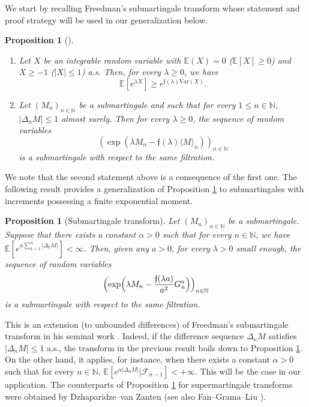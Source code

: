 \documentclass[JEP,XML,SOM,Unicode,published]{cedram}
\theoremstyle{plain}
\newtheorem{proposition}[theorem]{Proposition}
\theoremstyle{definition}
\newcommand\N{\mathbb{N}}
\begin{document}
We start by recalling Freedman's submartingale transform whose statement and proof strategy will be used in our generalization below.

\skpt
\begin{proposition}[{\cite[Cor.\,1.4(b), (3.7) \& (3.9)]{Freedman}}]\label{prop.freedman.submartingale}
\begin{enumerate}
\item
Let $X$ be an integrable random variable with $\mathbb{E}(X)=0$ (\resp $\mathbb{E}[X] \geq 0$) and $X\geq -1$ (\resp $|X| \leq 1$) a.s. Then, for every $\lambda \geq 0$, we have
\[
\mathbb{E}[e^{\lambda X}] \geq e^{\mathfrak{f}(\lambda) \mathrm{Var}(X)}.
\]
\item
Let $(M_n)_{n\in \N}$ be a submartingale and such that for every $1 \leq n \in \N$, $|\Delta_n M|\leq 1$ almost surely. Then for every $\lambda \geq 0$, the sequence of random variables
\[
\left(\exp\left(\lambda M_n - \mathfrak{f}(\lambda) \langle M\rangle_n\right)\right)_{n \in \N}
\]
is a submartingale with respect to the same filtration.
\end{enumerate}
\end{proposition}

We note that the second statement above is a consequence of the first one.
The following result provides a generalization of Proposition \ref{prop.freedman.submartingale} to submartingales with increments possessing a finite exponential moment.

\begin{proposition}[Submartingale transform]\label{prop.submart.trans}
Let $(M_n)_{n\in \N}$ be a submartingale. Suppose that there exists a constant $\alpha>0$ such that for every $n \in \N$, we have $\mathbb{E}[e^{\alpha \sum_{k=1}^n |\Delta_k M|}]<\infty$. Then, given any $a>0$, for every $\lambda >0$ small enough, the sequence of random variables
\[
\Bigl(\exp\Bigl(\lambda M_n - \frac{\mathfrak{f}(\lambda a)}{a^2}G_n^a\Bigr)\Bigr)_{n \in \N}
\]
is a submartingale with respect to the same filtration.
\end{proposition}

This is an extension (to unbounded differences) of Freedman's submartingale transform in his seminal work \cite{Freedman}. Indeed, if the difference sequence $\Delta_n M$ satisfies $|\Delta_n M| \leq 1$ a.s., the transform in the previous result boils down to Proposition \ref{prop.freedman.submartingale}. On the other hand, it applies, for instance, when there exists a constant $\alpha>0$ such that for every $n\in \N$, $\mathbb{E}[e^{\alpha |\Delta_n M|} | \mathcal{F}_{n-1}]<+\infty$.
This will be the case in our application.
The counterparts of Proposition \ref{prop.submart.trans} for supermartingale transforms were obtained by Dzhaparidze--van Zanten \cite{DZ} (see also Fan--Grama--Liu \cite{fan.grama.liu}).
\end{document}
